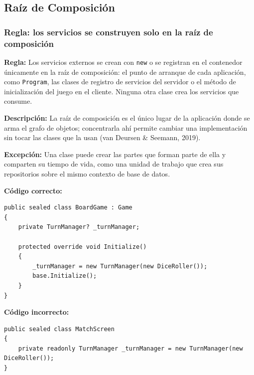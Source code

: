 \subsection{Raíz de Composición}

\subsubsection{Regla: los servicios se construyen solo en la raíz de composición}

\textbf{Regla:} Los servicios externos se crean con \texttt{new} o se registran en el contenedor únicamente en la raíz de composición: el punto de arranque de cada aplicación, como \texttt{Program}, las clases de registro de servicios del servidor o el método de inicialización del juego en el cliente. Ninguna otra clase crea los servicios que consume.

\textbf{Descripción:} La raíz de composición es el único lugar de la aplicación donde se arma el grafo de objetos; concentrarla ahí permite cambiar una implementación sin tocar las clases que la usan (van Deursen \& Seemann, 2019).

\textbf{Excepción:} Una clase puede crear las partes que forman parte de ella y comparten su tiempo de vida, como una unidad de trabajo que crea sus repositorios sobre el mismo contexto de base de datos.

\textbf{Código correcto:}
\begin{lstlisting}[style=csharpstyle]
public sealed class BoardGame : Game
{
    private TurnManager? _turnManager;

    protected override void Initialize()
    {
        _turnManager = new TurnManager(new DiceRoller());
        base.Initialize();
    }
}
\end{lstlisting}

\textbf{Código incorrecto:}
\begin{lstlisting}[style=csharpstyle]
public sealed class MatchScreen
{
    private readonly TurnManager _turnManager = new TurnManager(new DiceRoller());
}
\end{lstlisting}

